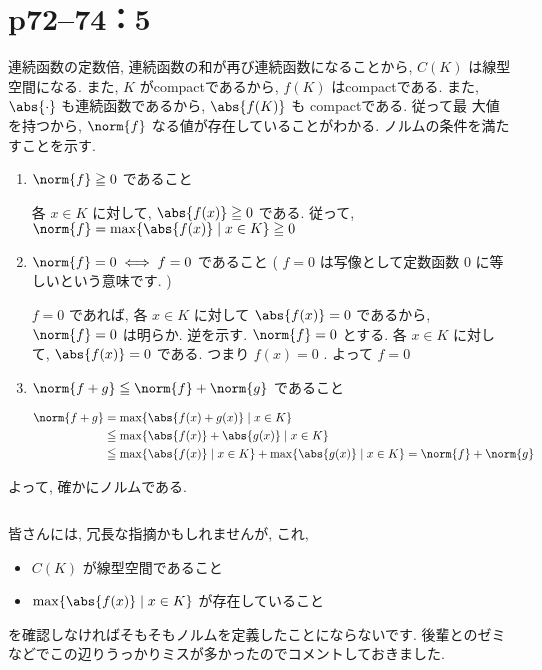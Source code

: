 \section*{p72--74：5}
\begin{tproof}
    連続函数の定数倍, 連続函数の和が再び連続函数になることから, $C ( K )$ は線型空間になる. また, $K$ がcompactであるから, $f ( K )$ はcompactである. また, $\abs{ \cdot }$ も連続函数であるから, $\abs{ f ( K ) }$ も compactである. 従って最
    大値を持つから, $\norm{ f }$ なる値が存在していることがわかる. ノルムの条件を満たすことを示す.
    \begin{enumerate}
        \item $\norm{ f } \geq 0$ であること

              \zw 各 $x \in K$ に対して, $\abs{f ( x ) } \geq 0$ である. 従って, $\norm{ f } = \max \{ \abs{ f ( x )} \mid x \in K \} \geq 0$

        \item $\norm{ f } = 0 \iff  f = 0$ であること ( $f = 0$ は写像として定数函数 $0$ に等しいという意味です. )

              $f = 0$ であれば, 各 $x \in K$ に対して $\abs{ f ( x ) } = 0$ であるから, $\norm{ f } = 0$ は明らか. 逆を示す. $\norm{ f } = 0$ とする. 各 $x \in K$ に対して, $\abs{ f ( x ) } = 0$ である. つまり $f ( x ) = 0$ . よって $f = 0$

        \item $\norm{ f + g } \leq \norm{ f } + \norm{ g }$ であること

              \begin{align*}
                  \norm{ f + g } & =  \max \{ \abs{ f ( x ) + g ( x )} \mid x \in K \}                                                                   \\
                                 & \leq  \max \{ \abs{ f ( x ) } + \abs{ g ( x ) } \mid x \in K \}                                                       \\
                                 & \leqq   \max \{ \abs{ f ( x ) }  \mid x \in K \} + \max \{ \abs{ g ( x ) }  \mid x \in K \} = \norm{ f } + \norm{ g }
              \end{align*}
    \end{enumerate}
    よって, 確かにノルムである.
\end{tproof}

\begin{column}
    皆さんには, 冗長な指摘かもしれませんが, これ,
    \begin{itemize}
        \item $C ( K )$ が線型空間であること
        \item $\max \{ \abs{ f ( x )} \mid x \in K \}$ が存在していること
    \end{itemize}
    を確認しなければそもそもノルムを定義したことにならないです. 後輩とのゼミなどでこの辺りうっかりミスが多かったのでコメントしておきました.
\end{column}



